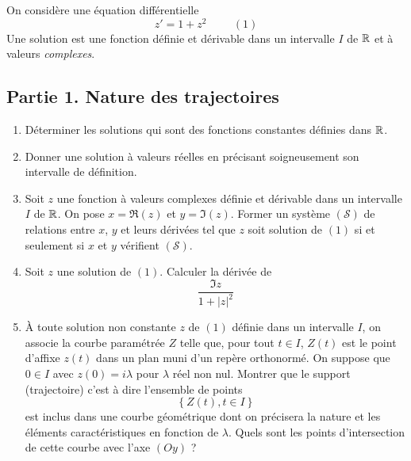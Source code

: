 On considère une équation différentielle
\begin{displaymath}
 z' = 1 + z^2 \hspace{1cm}(1)
\end{displaymath}
Une solution est une fonction définie et dérivable dans un intervalle $I$ de $\mathbb{R}$ et à valeurs \emph{complexes}.
\subsection*{Partie 1. Nature des trajectoires}
\begin{enumerate}
 \item Déterminer les solutions qui sont des fonctions constantes définies dans $\mathbb{R}$.
\item Donner une solution à valeurs réelles en précisant soigneusement son intervalle de définition.
\item Soit $z$ une fonction à valeurs complexes définie et dérivable dans un intervalle $I$ de $\mathbb{R}$. On pose $x=\Re(z)$ et $y=\Im(z)$.
Former un système $(\mathcal S)$ de relations entre $x$, $y$ et leurs dérivées tel que $z$ soit solution de $(1)$ si et seulement si $x$ et $y$ vérifient $(\mathcal S)$.
\item Soit $z$ une solution de $(1)$. Calculer la dérivée de
\begin{displaymath}
 \dfrac{\Im z}{1+|z|^2}
\end{displaymath}
\item \`A toute solution non constante $z$ de $(1)$ définie dans un intervalle $I$, on associe la courbe paramétrée $Z$ telle que, pour tout $t\in I$, $Z(t)$ est le point d'affixe $z(t)$ dans un plan muni d'un repère orthonormé.\newline
On suppose que $0\in I$ avec $z(0)=i\lambda$ pour $\lambda$ réel non nul. Montrer que le support (trajectoire) c'est à dire l'ensemble de points
\begin{displaymath}
 \left\lbrace Z(t), t\in I\right\rbrace 
\end{displaymath}
est inclus dans une courbe géométrique dont on précisera la nature et les éléments caractéristiques en fonction de $\lambda$. Quels sont les points d'intersection de cette courbe avec l'axe $(Oy)$ ?
\end{enumerate}

